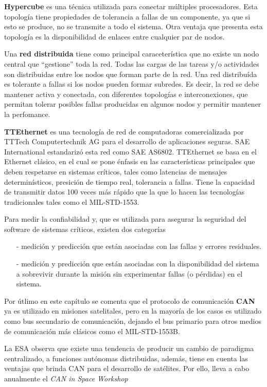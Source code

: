 \textbf{Hypercube} es una técnica utilizada para
conectar múltiples procesadores. Esta topología
tiene propiedades de tolerancia a fallas de un
componente, ya que si esto se produce, no se
transmite a todo el sistema. Otra ventaja que
presenta esta topología es la disponibilidad de
enlaces entre cualquier par de nodos.

Una \textbf{red distribuida} tiene como principal caraceterística que no existe un nodo central que ``gestione'' toda la red. Todas las cargas de las tareas y/o actividades son distribuidas entre los nodos que forman parte de la red. Una red distribuída es tolerante a fallas si los nodos pueden formar subredes. Es decir, la red se debe mantener activa y conectada, con diferentes topologías e interconexiones, que permitan tolerar posibles fallas producidas en algunos nodos y permitir mantener la perfomance.

\textbf{TTEthernet} es una tecnología de red de computadoras comercializada por TTTech Computertechnik AG para el desarrollo de aplicaciones seguras. SAE International estandarizó esta red como SAE AS6802. TTEthernet se basa en el Ethernet clásico, en el cual se pone énfasis en las características principales que deben respetarse en sistemas críticos, tales como latencias de mensajes determinísticos, presición de tiempo real, tolerancia a fallas. Tiene la capacidad de transmitir datos 100 veces más rápido que la que lo hacen las tecnologías tradicionales tales como el MIL-STD-1553.

Para medir la confiabilidad y, que es utilizada para
asegurar la seguridad del software de sistemas críticos, existen dos categorías
\begin{itemize}
    \item[-] medición y predicción que están asociadas con las fallas y errores residuales.
    \item[-] medición y predicción que están asociadas con la disponibilidad del sistema a sobrevivir durante la misión sin experimentar fallas (o pérdidas) en el sistema.
\end{itemize}

Por útlimo en este capítulo se comenta que el protocolo de comunicación
\textbf{CAN} ya es utilizado en misiones satelitales, pero en la mayoría de los
casos es utilizado como bus secundario de comunicación, dejando el bus
primario para otros medios de comunicación más clásicos como el
MIL-STD-1553B.

La ESA observa que existe
una tendencia de producir un cambio de  paradigma 
centralizado, a funciones autónomas distribuidas, además, tiene en cuenta las ventajas que
brinda CAN para el desarrollo de satélites. Por ello, lleva a cabo anualmente
el \textit{CAN in Space Workshop}
